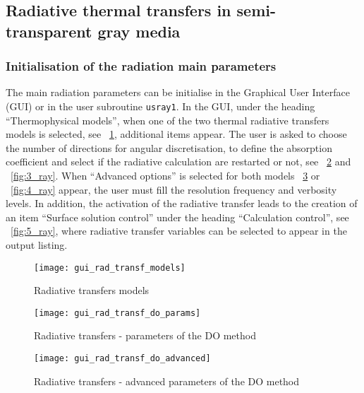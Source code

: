 {{\subsection{Radiative thermal transfers in semi-transparent gray media}
\subsubsection{Initialisation of the radiation main parameters}

The main radiation parameters can be initialise in the Graphical User Interface (GUI) or in the user subroutine \texttt{usray1}. In the GUI, under the heading ``Thermophysical models'', when one of the two thermal radiative transfers models is selected, see \figurename~\ref{fig:0_ray}, additional items appear. The user is asked to choose the number of directions for angular discretisation, to define the absorption coefficient and select if the radiative calculation are restarted or not,
see \figurename~\ref{fig:1_ray} and \figurename~\ref{fig:3_ray}. When ``Advanced options'' is selected for both models \figurename~\ref{fig:2_ray} or \figurename~\ref{fig:4_ray} appear, the user must fill the resolution frequency and verbosity levels. In addition, the activation of the radiative transfer leads to the creation of an item ``Surface solution control'' under the heading ``Calculation control'',
see \figurename~\ref{fig:5_ray}, where radiative transfer variables can be selected to appear in the output listing.

\begin{figure}[ht]
\begin{center}
\texttt{[image: gui\_rad\_transf\_models]}
\caption{Radiative transfers models}
\label{fig:0_ray}
\end{center}
\end{figure}

\begin{figure}[ht]
\begin{center}
\texttt{[image: gui\_rad\_transf\_do\_params]}
\caption{Radiative transfers - parameters of the DO method}
\label{fig:1_ray}
\end{center}
\end{figure}

\begin{figure}[ht]
\begin{center}
\texttt{[image: gui\_rad\_transf\_do\_advanced]}
\caption{Radiative transfers - advanced parameters of the DO method}
\label{fig:2_ray}
\end{center}
\end{figure}

}}
